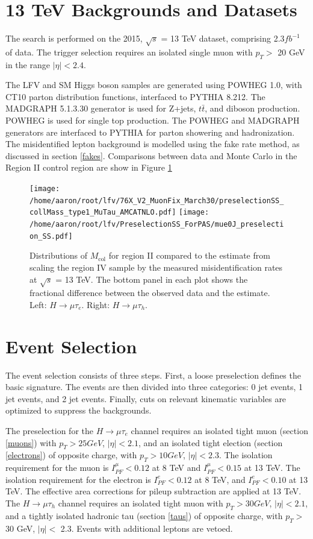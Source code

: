 \documentclass[oneside, letterpaper, oldfontcommands]{memoir}
\begin{document}
\section{13 TeV Backgrounds and Datasets}

\qquad The search is performed on the 2015, $\sqrt{s}$ = 13 TeV dataset, comprising 2.3$fb^{-1}$ of data. The trigger selection requires an isolated single muon with $p_{T} >$ 20 GeV in the range $|\eta| < 2.4$.

\qquad The LFV and SM Higgs boson samples are generated using POWHEG 1.0, with CT10 parton distribution functions, interfaced to PYTHIA 8.212. The MADGRAPH 5.1.3.30 generator is used for Z+jets, $t\bar{t}$, and diboson production. POWHEG is used for single top production. The POWHEG and MADGRAPH generators are interfaced to PYTHIA for parton showering and hadronization. The misidentified lepton background is modelled using the fake rate method, as discussed in section \ref{fakes}. Comparisons between data and Monte Carlo in the Region II control region are show in Figure \ref{fig:samesign_fakes13TeV} 

\begin{figure}[hbtp]\centering
\texttt{[image: /home/aaron/root/lfv/76X\_V2\_MuonFix\_March30/preselectionSS\_collMass\_type1\_MuTau\_AMCATNLO.pdf]}
\texttt{[image: /home/aaron/root/lfv/PreselectionSS\_ForPAS/mue0J\_preselection\_SS.pdf]}
\caption{Distributions of $M_\text{col}$ for region II compared to the estimate
from scaling the region IV sample by the measured misidentification rates at $\sqrt{s}$ = 13 TeV. The bottom panel in each plot shows the fractional difference between the observed data and the estimate. Left:  $H \rightarrow \mu \tau_{e}$. Right: $H \rightarrow \mu \tau_{h}$. }
\label{fig:samesign_fakes13TeV}\end{figure}
  
\section{Event Selection}\label{eventsel}
\qquad The event selection consists of three steps. First, a loose preselection defines the basic signature. The events are then divided into three categories: 0 jet events, 1 jet events, and 2 jet events. Finally, cuts on relevant kinematic variables are optimized to suppress the backgrounds. 

\qquad The preselection for the $H \rightarrow \mu\tau_{e}$ channel requires an isolated tight muon (section \ref{muons}) with $p_{T} > 25 GeV$, $|\eta| < 2.1$, and an isolated tight election (section \ref{electrons}) of opposite charge, with $p_{T} > 10 GeV$, $|\eta| < 2.3$. The isolation requirement for the muon is $I_{PF}^{\mu} < 0.12$ at 8 TeV and $I_{PF}^{\mu} < 0.15$ at 13 TeV. The isolation requirement for the electron is $I_{PF}^{e} < 0.12$ at 8 TeV, and $I_{PF}^{e} < 0.10$ at 13 TeV. The effective area corrections for pileup subtraction are applied at 13 TeV. The $H \rightarrow \mu\tau_{h}$ channel requires an isolated tight muon with $p_{T} > 30 GeV$, $|\eta| < 2.1$, and a tightly isolated hadronic tau (section \ref{taus}) of opposite charge, with $p_{T} >$ 30 GeV, $|\eta| <$ 2.3. Events with additional leptons are vetoed.
\end{document}

